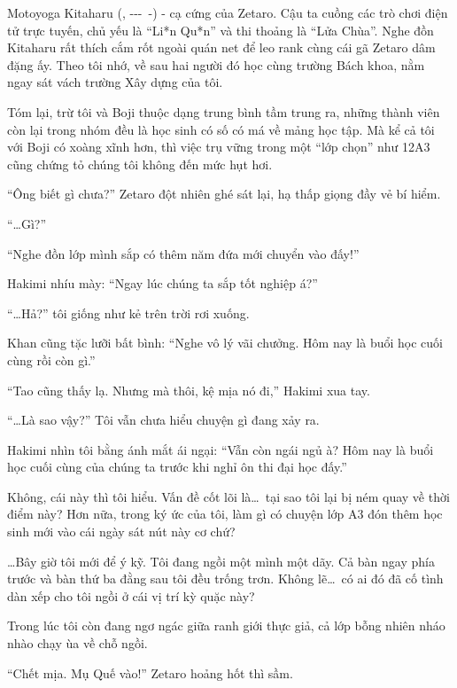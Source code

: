 \documentclass[../main.tex]{subfiles}
\begin{document}
Motoyoga Kitaharu (, ---\ -) - cạ cứng của Zetaro. Cậu ta cuồng các trò chơi điện tử trực tuyến, chủ yếu là ``Li*n Qu*n'' và thi thoảng là ``Lửa Chùa''. Nghe đồn Kitaharu rất thích cắm rốt ngoài quán net để leo rank cùng cái gã Zetaro dâm đặng ấy. Theo tôi nhớ, về sau hai người đó học cùng trường Bách khoa, nằm ngay sát vách trường Xây dựng của tôi.

Tóm lại, trừ tôi và Boji thuộc dạng trung bình tầm trung ra, những thành viên còn lại trong nhóm đều là học sinh có số có má về mảng học tập. Mà kể cả tôi với Boji có xoàng xĩnh hơn, thì việc trụ vững trong một ``lớp chọn'' như 12A3 cũng chứng tỏ chúng tôi không đến mức hụt hơi.

``Ông biết gì chưa?'' Zetaro đột nhiên ghé sát lại, hạ thấp giọng đầy vẻ bí hiểm.

``\dots Gì?''

``Nghe đồn lớp mình sắp có thêm năm đứa mới chuyển vào đấy!''

Hakimi nhíu mày: ``Ngay lúc chúng ta sắp tốt nghiệp á?''

``\dots Hả?'' tôi giống như kẻ trên trời rơi xuống.

Khan cũng tặc lưỡi bất bình: ``Nghe vô lý vãi chưởng. Hôm nay là buổi học cuối cùng rồi còn gì.''

``Tao cũng thấy lạ. Nhưng mà thôi, kệ mịa nó đi,'' Hakimi xua tay.

``\dots Là sao vậy?'' Tôi vẫn chưa hiểu chuyện gì đang xảy ra.

Hakimi nhìn tôi bằng ánh mắt ái ngại: ``Vẫn còn ngái ngủ à? Hôm nay là buổi học cuối cùng của chúng ta trước khi nghỉ ôn thi đại học đấy.''

Không, cái này thì tôi hiểu. Vấn đề cốt lõi là\dots\ tại sao tôi lại bị ném quay về thời điểm này? Hơn nữa, trong ký ức của tôi, làm gì có chuyện lớp A3 đón thêm học sinh mới vào cái ngày sát nút này cơ chứ?

\dots Bây giờ tôi mới để ý kỹ. Tôi đang ngồi một mình một dãy. Cả bàn ngay phía trước và bàn thứ ba đằng sau tôi đều trống trơn. Không lẽ\dots\ có ai đó đã cố tình dàn xếp cho tôi ngồi ở cái vị trí kỳ quặc này?

Trong lúc tôi còn đang ngơ ngác giữa ranh giới thực giả, cả lớp bỗng nhiên nháo nhào chạy ùa về chỗ ngồi.

``Chết mịa. Mụ Quế vào!'' Zetaro hoảng hốt thì sầm.
\end{document}
